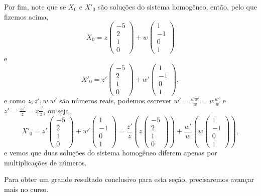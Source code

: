 \begin{ex}
	Por fim, note que se $X_0$ e $X'_0$ são soluções do sistema homogêneo, então, pelo que fizemos acima, 
	\[X_0=z\begin{pmatrix}
		-5\\2\\1\\0
	\end{pmatrix}+w\begin{pmatrix}
		1\\-1\\0\\1
	\end{pmatrix}\]e
	\[X'_0=z'\begin{pmatrix}
	-5\\2\\1\\0
	\end{pmatrix}+w'\begin{pmatrix}
	1\\-1\\0\\1
	\end{pmatrix},\] e como $z,z',w.w'$ são números reais, podemos escrever $w'=\frac{ww'}{w}=w\frac{w'}{w}$ e $z'=\frac{zz'}{z}=z\frac{z'}{z}$, ou seja,
	\[X'_0=z'\begin{pmatrix}
	-5\\2\\1\\0
	\end{pmatrix}+w'\begin{pmatrix}
	1\\-1\\0\\1
	\end{pmatrix}=\frac{z'}{z}\left(z\begin{pmatrix}
	-5\\2\\1\\0
	\end{pmatrix}\right)+\frac{w'}{w}\left(w\begin{pmatrix}
	1\\-1\\0\\1
	\end{pmatrix}\right),\]e vemos que duas soluções do sistema homogêneo diferem apenas por multiplicações de números.
\end{ex}

Para obter um grande resultado conclusivo para esta seção, precisaremos avançar mais no curso.

